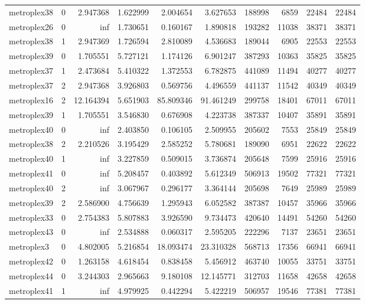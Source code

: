 \begin{longtable}{|l|r|r|r|r|r|r|r|r|r|}
metroplex38 & 0 & 2.947368 & 1.622999 & 2.004654 & 3.627653 & 188998 & 6859 & 22484 & 22484 \\
metroplex26 & 0 & inf & 1.730651 & 0.160167 & 1.890818 & 193282 & 11038 & 38371 & 38371 \\
metroplex38 & 1 & 2.947369 & 1.726594 & 2.810089 & 4.536683 & 189044 & 6905 & 22553 & 22553 \\
metroplex39 & 0 & 1.705551 & 5.727121 & 1.174126 & 6.901247 & 387293 & 10363 & 35825 & 35825 \\
metroplex37 & 1 & 2.473684 & 5.410322 & 1.372553 & 6.782875 & 441089 & 11494 & 40277 & 40277 \\
metroplex37 & 2 & 2.947368 & 3.926803 & 0.569756 & 4.496559 & 441137 & 11542 & 40349 & 40349 \\
metroplex16 & 2 & 12.164394 & 5.651903 & 85.809346 & 91.461249 & 299758 & 18401 & 67011 & 67011 \\
metroplex39 & 1 & 1.705551 & 3.546830 & 0.676908 & 4.223738 & 387337 & 10407 & 35891 & 35891 \\
metroplex40 & 0 & inf & 2.403850 & 0.106105 & 2.509955 & 205602 & 7553 & 25849 & 25849 \\
metroplex38 & 2 & 2.210526 & 3.195429 & 2.585252 & 5.780681 & 189090 & 6951 & 22622 & 22622 \\
metroplex40 & 1 & inf & 3.227859 & 0.509015 & 3.736874 & 205648 & 7599 & 25916 & 25916 \\
metroplex41 & 0 & inf & 5.208457 & 0.403892 & 5.612349 & 506913 & 19502 & 77321 & 77321 \\
metroplex40 & 2 & inf & 3.067967 & 0.296177 & 3.364144 & 205698 & 7649 & 25989 & 25989 \\
metroplex39 & 2 & 2.586900 & 4.756639 & 1.295943 & 6.052582 & 387387 & 10457 & 35966 & 35966 \\
metroplex33 & 0 & 2.754383 & 5.807883 & 3.926590 & 9.734473 & 420640 & 14491 & 54260 & 54260 \\
metroplex43 & 0 & inf & 2.534888 & 0.060317 & 2.595205 & 222296 & 7137 & 23651 & 23651 \\
metroplex3 & 0 & 4.802005 & 5.216854 & 18.093474 & 23.310328 & 568713 & 17356 & 66941 & 66941 \\
metroplex42 & 0 & 1.263158 & 4.618454 & 0.838458 & 5.456912 & 463740 & 10055 & 33751 & 33751 \\
metroplex44 & 0 & 3.244303 & 2.965663 & 9.180108 & 12.145771 & 312703 & 11658 & 42658 & 42658 \\
metroplex41 & 1 & inf & 4.979925 & 0.442294 & 5.422219 & 506957 & 19546 & 77381 & 77381 \\

\end{longtable}
